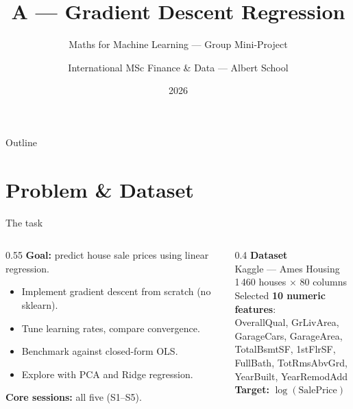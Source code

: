 \documentclass[aspectratio=169, 11pt]{beamer}
\title{A --- Gradient Descent Regression}
\subtitle{Maths for Machine Learning --- Group Mini-Project}
\author{International MSc Finance \& Data --- Albert School}
\date{2026}
\begin{document}
\begin{frame}[plain]
  \maketitle
\end{frame}

\begin{frame}{Outline}
  \tableofcontents
\end{frame}

\section{Problem \& Dataset}

\begin{frame}{The task}
  \begin{columns}[T]
    \begin{column}{0.55\textwidth}
      \textbf{Goal:} predict house sale prices using linear regression.

      \medskip
      \begin{itemize}
        \item Implement gradient descent \alert{from scratch} (no sklearn).
        \item Tune learning rates, compare convergence.
        \item Benchmark against closed-form OLS.
        \item Explore with PCA and Ridge regression.
      \end{itemize}

      \medskip
      \textbf{Core sessions:} all five (S1--S5).
    \end{column}
    \begin{column}{0.4\textwidth}
      \textbf{Dataset}\\[4pt]
      Kaggle --- Ames Housing\\
      1\,460 houses $\times$ 80 columns\\[6pt]
      Selected \textbf{10 numeric features}:\\
      OverallQual, GrLivArea,\\
      GarageCars, GarageArea,\\
      TotalBsmtSF, 1stFlrSF,\\
      FullBath, TotRmsAbvGrd,\\
      YearBuilt, YearRemodAdd\\[6pt]
      \textbf{Target:} $\log(\text{SalePrice})$
    \end{column}
  \end{columns}
\end{frame}
\end{document}
